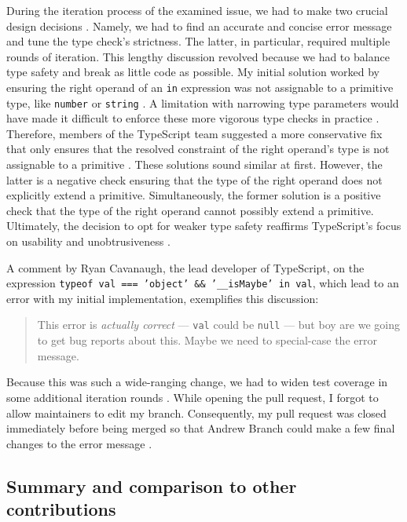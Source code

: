 \documentclass[12pt]{scrartcl}
\def\code#1{\texttt{\frenchspacing#1}}
\begin{document}
During the iteration process of the examined issue, we had to make two crucial design decisions \cite{41928}. Namely, we had to find an accurate and concise error message and tune the type check's strictness. The latter, in particular, required multiple rounds of iteration. This lengthy discussion revolved because we had to balance type safety and break as little code as possible. My initial solution worked by ensuring the right operand of an \code{in} expression was not assignable to a primitive type, like \code{number} or \code{string} \cite{41928Comment1}. A limitation with narrowing type parameters would have made it difficult to enforce these more vigorous type checks in practice \cite{13995}. Therefore, members of the TypeScript team suggested a more conservative fix that only ensures that the resolved constraint of the right operand's type is not assignable to a primitive \cite{41928Comment2}. These solutions sound similar at first. However, the latter is a negative check ensuring that the type of the right operand does not explicitly extend a primitive. Simultaneously, the former solution is a positive check that the type of the right operand cannot possibly extend a primitive. Ultimately, the decision to opt for weaker type safety reaffirms TypeScript's focus on usability and unobtrusiveness \cite{RyanDonovan2020}.

A comment by Ryan Cavanaugh, the lead developer of TypeScript, on the expression \code{typeof val === 'object' \&\& '\_\_isMaybe' in val}, which lead to an error with my initial implementation, exemplifies this discussion:

\begin{quote}
    This error is \textit{actually correct} --- \code{val} could be \code{null} --- but boy are we going to get bug reports about this. Maybe we need to special-case the error message. \cite{41928Comment3}
\end{quote}

Because this was such a wide-ranging change, we had to widen test coverage in some additional iteration rounds \cite{41928Comment4}. While opening the pull request, I forgot to allow maintainers to edit my branch. Consequently, my pull request was closed immediately before being merged so that Andrew Branch could make a few final changes to the error message \cite{42288}.

\subsection{Summary and comparison to other contributions}
\end{document}
